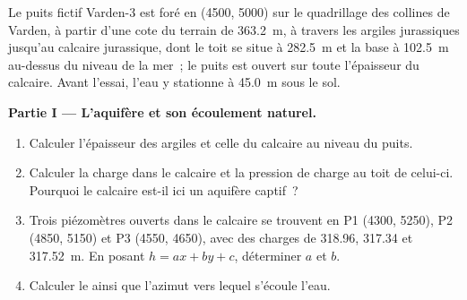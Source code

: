 \begin{problem}
\label{pb:b3:hydrogeology:1}
Le puits fictif Varden-3 est foré en (4500, 5000) sur le quadrillage des
collines de Varden, à partir d'une cote du terrain de \qty{363.2}{m}, à travers
les argiles jurassiques jusqu'au calcaire jurassique, dont le toit se situe à
\qty{282.5}{m} et la base à \qty{102.5}{m} au-dessus du niveau de la mer~; le puits est ouvert
sur toute l'épaisseur du calcaire. Avant l'essai, l'eau y stationne
à \qty{45.0}{m} sous le sol.

\medskip\noindent\textbf{Partie I --- L'aquifère et son écoulement naturel.}
\begin{enumerate}
\item Calculer l'épaisseur des argiles et celle du calcaire au niveau du puits.
\item Calculer la charge dans le calcaire et la pression de charge au toit de celui-ci.
  Pourquoi le calcaire est-il ici un aquifère captif~?
\item Trois piézomètres ouverts dans le calcaire se trouvent en P1 (4300, 5250), P2
  (4850, 5150) et P3 (4550, 4650), avec des charges de 318.96, 317.34 et
  \qty{317.52}{m}. En posant $h = ax + by + c$, déterminer $a$ et $b$.
\item Calculer le  ainsi que l'azimut vers lequel
  s'écoule l'eau.
\end{enumerate}


\end{problem}

